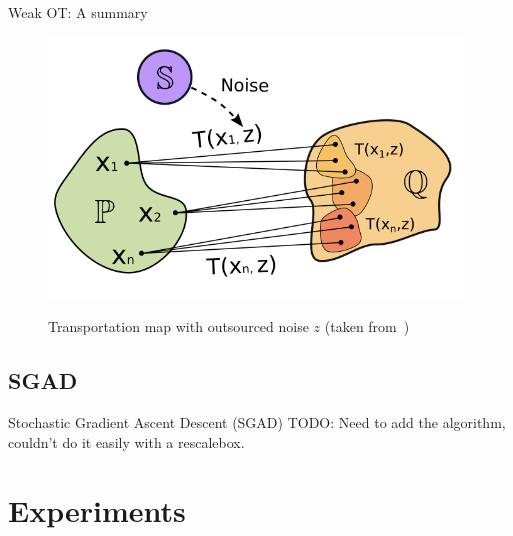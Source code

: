 \documentclass{beamer}
\begin{document}
\begin{frame}{Weak OT: A summary}
\begin{figure}
\centering
\includegraphics[width=0.9\linewidth]{figures/transportation-plan.png}
\label{transportation-map}
\caption{Transportation map with outsourced noise $z$ (taken from~\cite{korotin-2022})}
\end{figure}
\end{frame}

\subsection{SGAD}
\begin{frame}{Stochastic Gradient Ascent Descent (SGAD)}
TODO: Need to add the algorithm, couldn't do it easily with a rescalebox.
\end{frame}

\section{Experiments}
\end{document}
